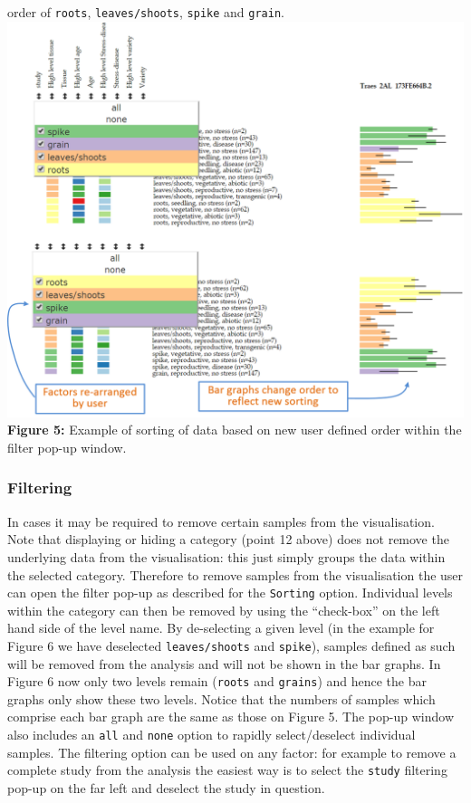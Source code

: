 \begin{enumerate}
  order of \lstinline!roots!, \lstinline!leaves/shoots!,
  \lstinline!spike! and \lstinline!grain!.
  \includegraphics{images/Figure4.png} \textbf{Figure 5:} Example of
  sorting of data based on new user defined order within the filter
  pop-up window.
\end{enumerate}

\subsubsection{\textbf{Filtering}}\label{filtering}

In cases it may be required to remove certain samples from the
visualisation. Note that displaying or hiding a category (point 12
above) does not remove the underlying data from the visualisation: this
just simply groups the data within the selected category. Therefore to
remove samples from the visualisation the user can open the filter
pop-up as described for the \lstinline!Sorting! option. Individual
levels within the category can then be removed by using the
``check-box'' on the left hand side of the level name. By de-selecting a
given level (in the example for Figure 6 we have deselected
\lstinline!leaves/shoots! and \lstinline!spike!), samples defined as
such will be removed from the analysis and will not be shown in the bar
graphs. In Figure 6 now only two levels remain (\lstinline!roots! and
\lstinline!grains!) and hence the bar graphs only show these two levels.
Notice that the numbers of samples which comprise each bar graph are the
same as those on Figure 5. The pop-up window also includes an
\lstinline!all! and \lstinline!none! option to rapidly select/deselect
individual samples. The filtering option can be used on any factor: for
example to remove a complete study from the analysis the easiest way is
to select the \lstinline!study! filtering pop-up on the far left and
deselect the study in question.

